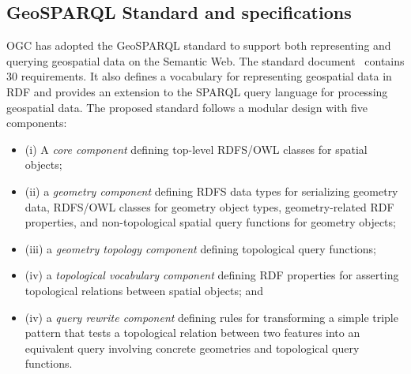 \subsection{GeoSPARQL Standard and specifications}
OGC has adopted the GeoSPARQL standard to support both representing and querying geospatial data on the Semantic Web. The standard document~\cite{ogc2012} contains 30 requirements. It also defines a vocabulary for representing geospatial data in RDF and provides an extension to the SPARQL query language for processing geospatial data. The proposed standard follows a modular design with five components: 
\begin{itemize}
\item (i) A \textit{core component} defining top-level RDFS/OWL classes for spatial objects; 
\item (ii) a \textit{geometry component} defining RDFS data types for serializing geometry data, RDFS/OWL classes for geometry object types, geometry-related RDF properties, and non-topological spatial query functions for geometry objects; 
\item (iii) a \textit{geometry topology component} defining topological query functions; 
\item (iv) a \textit{topological vocabulary component} defining RDF properties for asserting topological relations between spatial objects; and 
\item (iv) a \textit{query rewrite component} defining rules for transforming a simple triple pattern that tests a topological relation between two features into an equivalent query involving concrete geometries and topological query functions.
\end{itemize}

